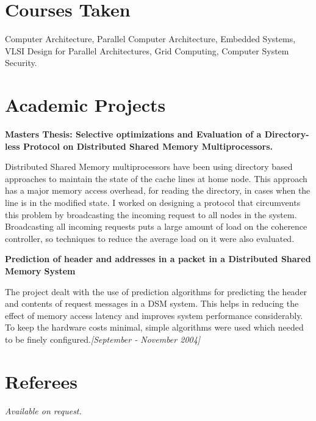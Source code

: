 \documentclass[margin,line]{resume}
\begin{document}
\begin{resume}
	\vfill \break

	\section{\mysidestyle Courses Taken}
	Computer Architecture, Parallel Computer Architecture, Embedded Systems, VLSI Design for Parallel Architectures, Grid Computing, Computer System Security.

	\section{\mysidestyle Academic Projects}

	\textbf{Masters Thesis: Selective optimizations and Evaluation of a Directory-less Protocol on Distributed Shared Memory Multiprocessors.}

	Distributed Shared Memory multiprocessors have been using directory based approaches to maintain the state of the cache lines at home node. This approach has a major memory access overhead, for reading the directory, in cases when the line is in the modified state. I worked on designing a protocol that circumvents this problem by broadcasting the incoming request to all nodes in the system. Broadcasting all incoming requests puts a large amount of load on the coherence controller, so techniques to reduce the average load on it were also evaluated.

	\textbf{Prediction of header and addresses in a packet in a Distributed Shared Memory System}

	The project dealt with the use of prediction algorithms for predicting the header and contents of request messages in a DSM system. This helps in reducing the effect of memory access latency and improves system performance considerably. To keep the hardware costs minimal, simple algorithms were used which needed to be finely configured.\hfill \emph{[September - November 2004]}
	\section{\mysidestyle Referees} 
	{\sl Available on request.}

	\end{resume}
	
\end{document}
